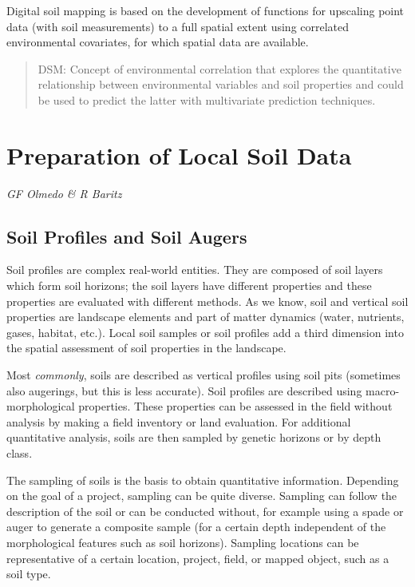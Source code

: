 \documentclass[10pt,b5paper,]{book}
\theoremstyle{definition}
\theoremstyle{definition}
\theoremstyle{definition}
\theoremstyle{remark}
\begin{document}
Digital soil mapping is based on the development of functions for
upscaling point data (with soil measurements) to a full spatial extent
using correlated environmental covariates, for which spatial data are
available.

\begin{quote}
DSM: Concept of environmental correlation that explores the quantitative
relationship between environmental variables and soil properties and
could be used to predict the latter with multivariate prediction
techniques.
\end{quote}

\hypertarget{preparation}{%
\chapter{Preparation of Local Soil Data}\label{preparation}}

\emph{GF Olmedo \& R Baritz}

\hypertarget{soil-profiles-and-soil-augers}{%
\section{Soil Profiles and Soil
Augers}\label{soil-profiles-and-soil-augers}}

Soil profiles are complex real-world entities. They are composed of soil
layers which form soil horizons; the soil layers have different
properties and these properties are evaluated with different methods. As
we know, soil and vertical soil properties are landscape elements and
part of matter dynamics (water, nutrients, gases, habitat, etc.). Local
soil samples or soil profiles add a third dimension into the spatial
assessment of soil properties in the landscape.

Most \emph{commonly}, soils are described as vertical profiles using
soil pits (sometimes also augerings, but this is less accurate). Soil
profiles are described using macro-morphological properties. These
properties can be assessed in the field without analysis by making a
field inventory or land evaluation. For additional quantitative
analysis, soils are then sampled by genetic horizons or by depth class.

The sampling of soils is the basis to obtain quantitative information.
Depending on the goal of a project, sampling can be quite diverse.
Sampling can follow the description of the soil or can be conducted
without, for example using a spade or auger to generate a composite
sample (for a certain depth independent of the morphological features
such as soil horizons). Sampling locations can be representative of a
certain location, project, field, or mapped object, such as a soil type.
\end{document}
